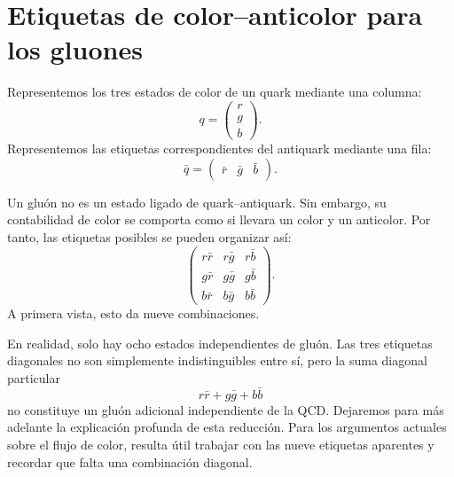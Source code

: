 \section{Etiquetas de color--anticolor para los gluones}

Representemos los tres estados de color de un quark mediante una columna:
\begin{equation}
q=
\begin{pmatrix}
r\\
g\\
b
\end{pmatrix}.
\end{equation}
Representemos las etiquetas correspondientes del antiquark mediante una fila:
\begin{equation}
\bar q=
\begin{pmatrix}
\bar r&\bar g&\bar b
\end{pmatrix}.
\end{equation}

Un gluón no es un estado ligado de quark--antiquark. Sin embargo, su contabilidad de color se comporta como si llevara un color y un anticolor. Por tanto, las etiquetas posibles se pueden organizar así:
\begin{equation}
\begin{pmatrix}
r\bar r&r\bar g&r\bar b\\
g\bar r&g\bar g&g\bar b\\
b\bar r&b\bar g&b\bar b
\end{pmatrix}.
\end{equation}
A primera vista, esto da nueve combinaciones.

\begin{classroomqa}
\end{classroomqa}

En realidad, solo hay ocho estados independientes de gluón. Las tres etiquetas diagonales no son simplemente indistinguibles entre sí, pero la suma diagonal particular
\begin{equation}
r\bar r+g\bar g+b\bar b
\end{equation}
no constituye un gluón adicional independiente de la QCD. Dejaremos para más adelante la explicación profunda de esta reducción. Para los argumentos actuales sobre el flujo de color, resulta útil trabajar con las nueve etiquetas aparentes y recordar que falta una combinación diagonal.

